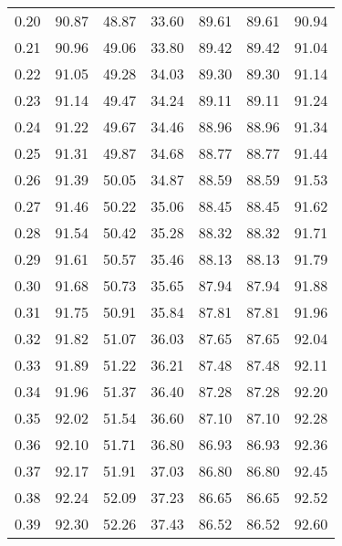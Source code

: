 \begin{tabular}{|c|c|c|c|c|c|c|}
      0.20 &     90.87 &     48.87 &      33.60 &   89.61 &      89.61 &         90.94 \\
      0.21 &     90.96 &     49.06 &      33.80 &   89.42 &      89.42 &         91.04 \\
      0.22 &     91.05 &     49.28 &      34.03 &   89.30 &      89.30 &         91.14 \\
      0.23 &     91.14 &     49.47 &      34.24 &   89.11 &      89.11 &         91.24 \\
      0.24 &     91.22 &     49.67 &      34.46 &   88.96 &      88.96 &         91.34 \\
      0.25 &     91.31 &     49.87 &      34.68 &   88.77 &      88.77 &         91.44 \\
      0.26 &     91.39 &     50.05 &      34.87 &   88.59 &      88.59 &         91.53 \\
      0.27 &     91.46 &     50.22 &      35.06 &   88.45 &      88.45 &         91.62 \\
      0.28 &     91.54 &     50.42 &      35.28 &   88.32 &      88.32 &         91.71 \\
      0.29 &     91.61 &     50.57 &      35.46 &   88.13 &      88.13 &         91.79 \\
      0.30 &     91.68 &     50.73 &      35.65 &   87.94 &      87.94 &         91.88 \\
      0.31 &     91.75 &     50.91 &      35.84 &   87.81 &      87.81 &         91.96 \\
      0.32 &     91.82 &     51.07 &      36.03 &   87.65 &      87.65 &         92.04 \\
      0.33 &     91.89 &     51.22 &      36.21 &   87.48 &      87.48 &         92.11 \\
      0.34 &     91.96 &     51.37 &      36.40 &   87.28 &      87.28 &         92.20 \\
      0.35 &     92.02 &     51.54 &      36.60 &   87.10 &      87.10 &         92.28 \\
      0.36 &     92.10 &     51.71 &      36.80 &   86.93 &      86.93 &         92.36 \\
      0.37 &     92.17 &     51.91 &      37.03 &   86.80 &      86.80 &         92.45 \\
      0.38 &     92.24 &     52.09 &      37.23 &   86.65 &      86.65 &         92.52 \\
      0.39 &     92.30 &     52.26 &      37.43 &   86.52 &      86.52 &         92.60 \\

\end{tabular}
